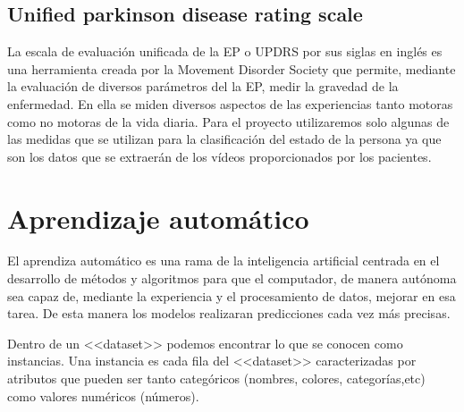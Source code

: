 \subsection{Unified parkinson disease rating scale}

La escala de evaluación unificada de la EP o UPDRS por sus siglas en inglés es una herramienta creada por la Movement Disorder Society que permite, mediante la evaluación de diversos parámetros del la EP, medir la gravedad de la enfermedad. En ella se miden diversos aspectos de las experiencias tanto motoras como no motoras de la vida diaria. Para el proyecto utilizaremos solo algunas de las medidas que se utilizan para la clasificación del estado de la persona ya que son los datos que se extraerán de los vídeos proporcionados por los pacientes.


\section{Aprendizaje automático}

El aprendiza automático es una rama de la inteligencia artificial centrada en el desarrollo de métodos y algoritmos para que el computador, de manera autónoma sea capaz de, mediante la experiencia y el procesamiento de datos, mejorar en esa tarea. De esta manera los modelos realizaran predicciones cada vez más precisas.

Dentro de un <<dataset>> podemos encontrar lo que se conocen como instancias. Una instancia es cada fila del <<dataset>> caracterizadas por atributos que pueden ser tanto categóricos (nombres, colores, categorías,etc) como valores numéricos (números).


